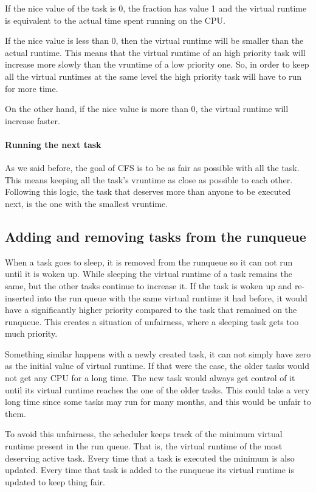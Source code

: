 If the nice value of the task is 0, the fraction has value 1 and the virtual runtime is equivalent to the actual time spent running on the CPU.

If the nice value is less than 0, then the virtual runtime will be smaller than the actual runtime. This means that the virtual runtime of an high priority task will increase more slowly than the vruntime of a low priority one. So, in order to keep all the virtual runtimes at the same level the high priority task will have to run for more time.

On the other hand, if the nice value is more than 0, the virtual runtime will increase faster.

\paragraph{Running the next task}

As we said before, the goal of CFS is to be as fair as possible with all the task. This means keeping all the task's vruntime as close as possible to each other. Following this logic, the task that deserves more than anyone to be executed next, is the one with the smallest vruntime.

\subsection{Adding and removing tasks from the runqueue}
When a task goes to sleep, it is removed from the runqueue so it can not run until it is woken up. While sleeping the virtual runtime of a task remains the same, but the other tasks continue to increase it. If the task is woken up and re-inserted into the run queue with the same virtual runtime it had before, it would have a significantly higher priority compared to the task that remained on the runqueue. This creates a situation of unfairness, where a sleeping task gets too much priority.

Something similar happens with a newly created task, it can not simply have zero as the initial value of virtual runtime. If that were the case, the older tasks would not get any CPU for a long time. The new task would always get control of it until its virtual runtime reaches the one of the older tasks. This could take a very long time since some tasks may run for many months, and this would be unfair to them.

To avoid this unfairness, the scheduler keeps track of the minimum virtual runtime present in the run queue. That is, the virtual runtime of the most deserving active task. Every time that a task is executed the minimum is also updated. Every time that task is added to the runqueue its virtual runtime is updated to keep thing fair.

